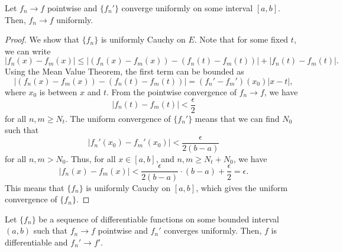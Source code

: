 \documentclass[11pt]{article}
\theoremstyle{definition}
\theoremstyle{remark}
\numberwithin{equation}{module}
\begin{document}
    \begin{theorem}
        Let $f_n \to f$ pointwise and $\{f_n'\}$ converge uniformly on some interval
        $[a, b]$. Then, $f_n \to f$ uniformly.
    \end{theorem}
    \begin{proof}
        We show that $\{f_n\}$ is uniformly Cauchy on $E$. Note that for some
        fixed $t$, we can write\[
            |f_n(x) - f_m(x)| \leq |(f_n(x) - f_m(x)) - (f_n(t) - f_m(t))| +
            |f_n(t) - f_m(t)|.
        \] Using the Mean Value Theorem, the first term can be bounded as \[
            |(f_n(x) - f_m(x)) - (f_n(t) - f_m(t))| = (f_n' - f_m')(x_0)|x - t|,
        \] where $x_0$ is between $x$ and $t$.
        From the pointwise convergence of $f_n \to f$, we have \[
            |f_n(t) - f_m(t)| < \frac{\epsilon}{2}
        \] for all $n, m \geq N_t$. The uniform convergence of
        $\{f_n'\}$ means that we can find $N_0$ such that \[
            |f_n'(x_0) - f_m'(x_0)| < \frac{\epsilon}{2(b - a)}
        \] for all $n, m > N_0$. Thus, for all $x \in [a, b]$, and $n, m \geq
        N_t + N_0$, we have \[
            |f_n(x) - f_m(x)| < \frac{\epsilon}{2(b - a)}\cdot (b - a) +
            \frac{\epsilon}{2} = \epsilon.
        \] This means that $\{f_n\}$ is uniformly Cauchy on $[a, b]$, which
        gives the uniform convergence of $\{f_n\}$.
    \end{proof}

    \begin{theorem}
        Let $\{f_n\}$ be a sequence of differentiable functions on some bounded
        interval $(a, b)$ such that $f_n \to f$ pointwise and ${f_n'}$ converges
        uniformly.  Then, $f$ is differentiable and $f_n' \to f'$.
    \end{theorem}
    
\end{document}
